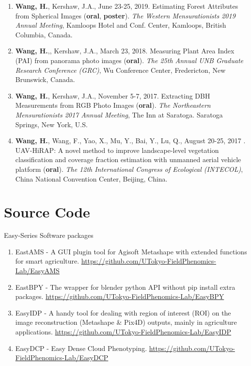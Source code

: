 \begin{enumerate}
  \item \textbf{Wang, H.}, Kershaw, J.A., June 23-25, 2019. Estimating Forest Attributes from Spherical Images (\textbf{oral}, \textbf{poster}). \textit{The Western Mensurationists 2019 Annual Meeting}, Kamloops Hotel and Conf. Center, Kamloops, British Columbia, Canada.
  \item \textbf{Wang, H.},, Kershaw, J.A., March 23, 2018. Measuring Plant Area Index (PAI) from panorama photo images (\textbf{oral}). \textit{The 25th Annual UNB Graduate Research Conference (GRC)}, Wu Conference Center, Fredericton, New Brunswick, Canada.
  \item \textbf{Wang, H.}, Kershaw, J.A., November 5-7, 2017. Extracting DBH Measurements from RGB Photo Images (\textbf{oral}). \textit{The Northeastern Mensurationists 2017 Annual Meeting}, The Inn at Saratoga. Saratoga Springs, New York, U.S.
  \item \textbf{Wang, H.}, Wang, F., Yao, X., Mu, Y., Bai, Y., Lu, Q., August 20-25, 2017 . UAV-HiRAP: A novel method to improve landscape-level vegetation classification and coverage fraction estimation with unmanned aerial vehicle platform (\textbf{oral}). \textit{The 12th International Congress of Ecological (INTECOL)}, China National Convention Center, Beijing, China.
\end{enumerate}

\section*{Source Code}

\noindent
Easy-Series Software packages

\begin{enumerate}
  \item EastAMS - A GUI plugin tool for Agisoft Metashape with extended functions for smart agriculture. \url{https://github.com/UTokyo-FieldPhenomics-Lab/EasyAMS}
  \item EastBPY - The wrapper for blender python API without pip install extra packages. \url{https://github.com/UTokyo-FieldPhenomics-Lab/EasyBPY}
  \item EasyIDP - A handy tool for dealing with region of interest (ROI) on the image reconstruction (Metashape \& Pix4D) outputs, mainly in agriculture applications. \url{https://github.com/UTokyo-FieldPhenomics-Lab/EasyIDP}
  \item  EasyDCP - Easy Dense Cloud Phenotyping. \url{https://github.com/UTokyo-FieldPhenomics-Lab/EasyDCP}
\end{enumerate}

